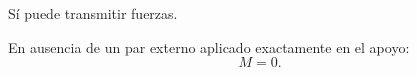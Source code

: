 Sí puede transmitir fuerzas.

En ausencia de un par externo aplicado exactamente en el apoyo:
\[
M=0.
\]

